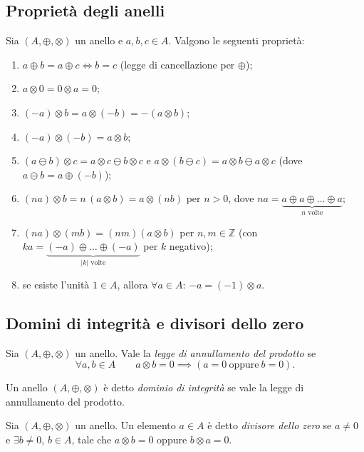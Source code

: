 \documentclass[11pt,a4paper]{article}
\begin{document}
\subsection{Proprietà degli anelli}

Sia $(A, \oplus, \otimes)$ un anello e $a, b, c \in A$. Valgono le seguenti proprietà:
\begin{enumerate}
  \item $a \oplus b = a \oplus c \iff b = c$ (legge di cancellazione per $\oplus$);
  \item $a \otimes 0 = 0 \otimes a = 0$;
  \item $(-a)\otimes b = a \otimes (-b) = -(a \otimes b)$;
  \item $(-a)\otimes(-b) = a \otimes b$;
  \item $(a \ominus b)\otimes c = a \otimes c \ominus b \otimes c$ e $a \otimes (b \ominus c) = a \otimes b \ominus a \otimes c$ (dove $a \ominus b = a \oplus (-b)$);
  \item $(na)\otimes b = n\,(a \otimes b) = a \otimes (nb)$ per $n > 0$, dove $na = \underbrace{a \oplus a \oplus \dots \oplus a}_{n\text{ volte}}$;
  \item $(na)\otimes(mb) = (nm)(a \otimes b)$ per $n, m \in \mathbb{Z}$ (con $ka = \underbrace{(-a)\oplus\dots\oplus(-a)}_{|k|\text{ volte}}$ per $k$ negativo);
  \item se esiste l'unità $1 \in A$, allora $\forall a \in A$: $-a = (-1)\otimes a$.
\end{enumerate}

\subsection{Domini di integrità e divisori dello zero}

\begin{definizione}
Sia $(A, \oplus, \otimes)$ un anello. Vale la \emph{legge di annullamento del prodotto} se
\[
  \forall a, b \in A \qquad a \otimes b = 0 \implies (a = 0 \ \text{oppure}\ b = 0).
\]
\end{definizione}

\begin{definizione}
Un anello $(A, \oplus, \otimes)$ è detto \emph{dominio di integrità} se vale la legge di annullamento del prodotto.
\end{definizione}

\begin{definizione}
Sia $(A, \oplus, \otimes)$ un anello. Un elemento $a \in A$ è detto \emph{divisore dello zero} se $a \neq 0$ e $\exists b \neq 0$, $b \in A$, tale che $a \otimes b = 0$ oppure $b \otimes a = 0$.
\end{definizione}
\end{document}
